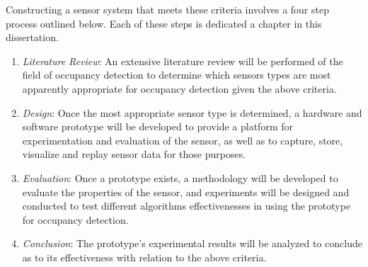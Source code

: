 \documentclass[../thesis/thesis.tex]{subfiles}
\begin{document}
Constructing a sensor system that meets these criteria involves a four step process outlined below. Each of these steps is dedicated a chapter in this dissertation.
\begin{enumerate}
\item \emph{Literature Review}: An extensive literature review will be performed of the field of occupancy detection to determine which sensors types are most apparently appropriate for occupancy detection given the above criteria.

\item \emph{Design}: Once the most appropriate sensor type is determined, a hardware and software prototype will be developed to provide a platform for experimentation and evaluation of the sensor, as well as to capture, store, visualize and replay sensor data for those purposes.

\item \emph{Evaluation}: Once a prototype exists, a methodology will be developed to evaluate the properties of the sensor, and experiments will be designed and conducted to test different algorithms effectivenesses in using the prototype for occupancy detection.

\item \emph{Conclusion}: The prototype's experimental results will be analyzed to conclude as to its effectiveness with relation to the above criteria.
\end{enumerate}
 
\end{document}
